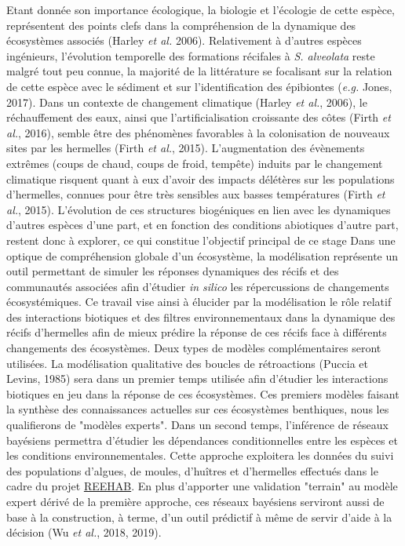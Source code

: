 \documentclass[12pt]{report}
\begin{document}
\newline \newline
Etant donnée son importance écologique, la biologie et l’écologie de cette espèce, représentent des points clefs dans la compréhension de la dynamique des écosystèmes associés (Harley \textit{et al.} 2006). Relativement à d’autres espèces ingénieurs, l’évolution temporelle des formations récifales à \textit{S. alveolata} reste malgré tout peu connue, la majorité de la littérature se focalisant sur la relation de cette espèce avec le sédiment et sur l’identification des épibiontes (\textit{e.g.} Jones, 2017). Dans un contexte de changement climatique (Harley \textit{et al.}, 2006), le réchauffement des eaux, ainsi que l’artificialisation croissante des côtes (Firth \textit{et al.}, 2016), semble être des phénomènes favorables à la colonisation de nouveaux sites par les hermelles (Firth \textit{et al.}, 2015). L'augmentation des évènements extrêmes (coups de chaud, coups de froid, tempête) induits par le changement climatique risquent quant à eux d'avoir des impacts délétères sur les populations d'hermelles, connues pour être très sensibles aux basses températures (Firth \textit{et al.}, 2015). L’évolution de ces structures biogéniques en lien avec les dynamiques d'autres espèces d’une part, et en fonction des conditions abiotiques d’autre part, restent donc à explorer, ce qui constitue l’objectif principal de ce stage
\newline\newline
Dans une optique de compréhension globale d’un écosystème, la modélisation représente un outil permettant de simuler les réponses dynamiques des récifs et des communautés associées afin d’étudier \textit{in silico} les répercussions de changements écosystémiques. Ce travail vise ainsi à élucider par la modélisation le rôle relatif des interactions biotiques et des filtres environnementaux dans la dynamique des récifs d'hermelles afin de mieux prédire la réponse de ces récifs face à différents changements des écosystèmes. Deux types de modèles complémentaires seront utilisées. La modélisation qualitative des boucles de rétroactions (Puccia et Levins, 1985) sera dans un premier temps utilisée afin d'étudier les interactions biotiques en jeu dans la réponse de ces écosystèmes. Ces premiers modèles faisant la synthèse des connaissances actuelles sur ces écosystèmes benthiques, nous les qualifierons de "modèles experts". Dans un second temps, l'inférence de réseaux bayésiens permettra d'étudier les dépendances conditionnelles entre les espèces et les conditions environnementales. Cette approche exploitera les données du suivi des populations d'algues, de moules, d'huîtres et d'hermelles effectués dans le cadre du projet \href{http://www.hermelles.fr/Le-projet-REEHAB}{REEHAB}.  En plus d'apporter une validation "terrain" au modèle expert dérivé de la première approche, ces réseaux bayésiens serviront aussi de base à la construction, à terme, d'un outil prédictif à même de servir d'aide à la décision (Wu \textit{et al.}, 2018, 2019).
\end{document}
